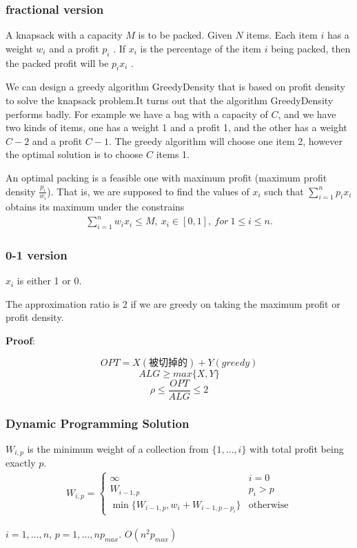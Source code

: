 \documentclass{article}
\begin{document}
\subsubsection{fractional version}
A knapsack with a capacity  $M$  is to be packed.  Given $N$ items.  Each item  $i$  has a weight  $w_i$  and a profit  $p_i$ .  If  $x_i$ is the percentage of the item $i$  being packed,  then the packed profit will be  $p_i x_i$ .\par
We can design a greedy algorithm GreedyDensity that is based on profit density to solve the knapsack
problem.It turns out that the algorithm GreedyDensity performs badly. For example we have a bag with a capacity of $C$, and we have two kinds of items, one has a weight 1 and a profit 1, and the other has a weight $C-2$ and a profit $C-1$. The greedy algorithm will choose one item 2, however the optimal solution is to choose $C$ items 1.\par
An optimal packing is a feasible one with maximum profit (maximum profit density $\frac{p_i}{w_i}$).  That is,  we are supposed to find the values of $x_i$  such that $\displaystyle \sum_{i=1}^np_i x_i$ obtains its maximum under the constrains
\begin{align*}
    \sum_{i=1}^n w_i x_i \le M ,\ x_i\in[0,1] ,\ for\ 1\le i\le n. 
\end{align*}

\subsubsection{0-1 version}
$x_i$ is either 1 or 0. 

The approximation ratio is 2 if we are greedy on taking the maximum profit or profit density. \par
\textbf{Proof}:
\par\hspace*{\fill}\par
$$OPT = X(\text{被切掉的}) + Y(greedy)$$
$$ALG \ge max\{X,Y\}$$
$$\rho \le \frac{OPT}{ALG} \le 2$$

\subsubsection{Dynamic Programming Solution}
$W_{i, p}$ is the minimum weight of a collection from $\{1, \dots, i \}$ with total profit being  exactly $p$. 
\begin{align*}
    W_{i,p}=\left\{ \begin{array}{ll}
        \infty & i=0\\
        W_{i-1, p} & p_i>p\\
        \min\{ W_{i-1, p}, w_i+W_{i-1, p-p_i} \} & \text{otherwise}
    \end{array} \right.
\end{align*}\par
$i=1,\dots,n$, $p=1,\dots,np_{max}$. $O(n^2 p_{max})$
\end{document}
